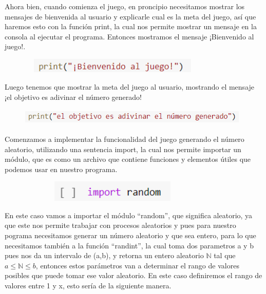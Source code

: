 \documentclass[a4paper,12pt]{article}
\begin{document}
\large{Ahora bien, cuando comienza el juego, en proncipio necesitamos mostrar los mensajes de bienvenida al usuario y explicarle cual es la meta del juego, así que haremos esto con la función print, la cual nos permite mostrar un mensaje en la consola al ejecutar el programa. Entonces mostramos el mensaje ¡Bienvenido al juego!.}

\begin{figure}[H]
    \caption{}
    \centering \includegraphics[width=9cm, height=0.7cm]{ba.png}
    \label{fig1:my_label}
\end{figure}

\large{Luego tenemos que mostrar la meta del juego al usuario, mostrando el mensaje ¡el objetivo es adivinar el número generado!}

\begin{figure}[H]
    \caption{}
    \centering \includegraphics[width=11cm, height=0.8cm]{ob.png}
    \label{fig1:my_label}
\end{figure}

\large{Comenzamos a implementar la funcionalidad del juego generando el número aleatorio, utilizando una sentencia import, la cual nos permite importar un módulo, que es como un archivo que contiene funciones y elementos útiles que podemos usar en nuestro programa. }

\begin{figure}[H]
    \caption{}
    \centering \includegraphics[width=9cm, height=1cm]{ir.png}
    \label{fig1:my_label}
\end{figure}

\large{En este caso vamos a importar el módulo ``random'', que significa aleatorio, ya que este nos permite trabajar con procesos aleatorios y pues para nuestro pograma necesitamos generar un número aleatorio y que sea entero, para lo que necesitamos también a la función ``randint'', la cual toma dos parametros a y b pues nos da un intervalo de (a,b), y retorna un entero aleatorio $\mathbb{N}$ tal que $a\leq \mathbb{N} \leq b$, entonces estos parámetros van a determinar
el rango de valores posibles que puede tomar ese valor aleatorio. En este caso definiremos el rango de valores entre 1 y x, esto sería de la siguiente manera.}
\end{document}
